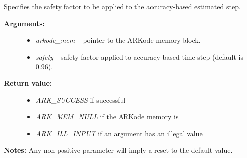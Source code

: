\documentclass[letterpaper,10pt,english]{sphinxmanual}
\begin{document}
\begin{fulllineitems}
\label{c_interface/User_callable:ARKodeSetSafetyFactor}
Specifies the safety factor to be applied to the accuracy-based
estimated step.
\begin{description}
\item[{\textbf{Arguments:}}] \leavevmode\begin{itemize}
\item {} 
\emph{arkode\_mem} -- pointer to the ARKode memory block.

\item {} 
\emph{safety} -- safety factor applied to accuracy-based time step (default is 0.96).

\end{itemize}

\item[{\textbf{Return value:}}] \leavevmode\begin{itemize}
\item {} 
\emph{ARK\_SUCCESS} if successful

\item {} 
\emph{ARK\_MEM\_NULL} if the ARKode memory is 

\item {} 
\emph{ARK\_ILL\_INPUT} if an argument has an illegal value

\end{itemize}

\end{description}

\textbf{Notes:} Any non-positive parameter will imply a reset to the default
value.

\end{fulllineitems}

\end{document}
